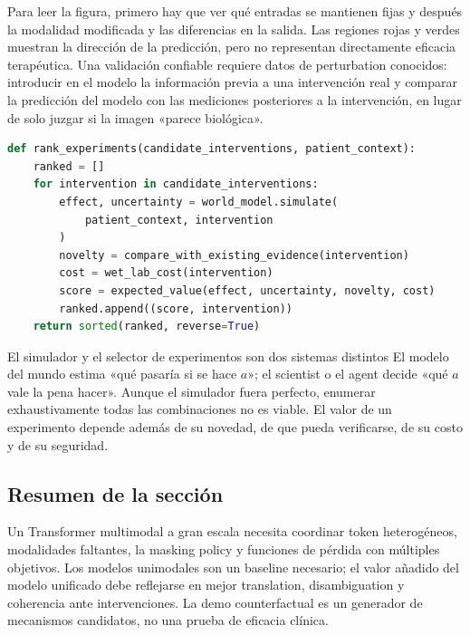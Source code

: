 
Para leer la figura, primero hay que ver qué entradas se mantienen fijas y después la modalidad modificada y las diferencias en la salida. Las regiones rojas y verdes muestran la dirección de la predicción, pero no representan directamente eficacia terapéutica. Una validación confiable requiere datos de perturbation conocidos: introducir en el modelo la información previa a una intervención real y comparar la predicción del modelo con las mediciones posteriores a la intervención, en lugar de solo juzgar si la imagen «parece biológica».

\begin{lstlisting}[language=Python,caption={Prioridad de experimentos: considerar a la vez el efecto según el modelo, la incertidumbre y el costo de la validación real}]
def rank_experiments(candidate_interventions, patient_context):
    ranked = []
    for intervention in candidate_interventions:
        effect, uncertainty = world_model.simulate(
            patient_context, intervention
        )
        novelty = compare_with_existing_evidence(intervention)
        cost = wet_lab_cost(intervention)
        score = expected_value(effect, uncertainty, novelty, cost)
        ranked.append((score, intervention))
    return sorted(ranked, reverse=True)
\end{lstlisting}

\begin{importantbox}{El simulador y el selector de experimentos son dos sistemas distintos}
El modelo del mundo estima «qué pasaría si se hace $a$»; el scientist o el agent decide «qué $a$ vale la pena hacer». Aunque el simulador fuera perfecto, enumerar exhaustivamente todas las combinaciones no es viable. El valor de un experimento depende además de su novedad, de que pueda verificarse, de su costo y de su seguridad.
\end{importantbox}

\subsection{Resumen de la sección}

Un Transformer multimodal a gran escala necesita coordinar token heterogéneos, modalidades faltantes, la masking policy y funciones de pérdida con múltiples objetivos. Los modelos unimodales son un baseline necesario; el valor añadido del modelo unificado debe reflejarse en mejor translation, disambiguation y coherencia ante intervenciones. La demo counterfactual es un generador de mecanismos candidatos, no una prueba de eficacia clínica.
